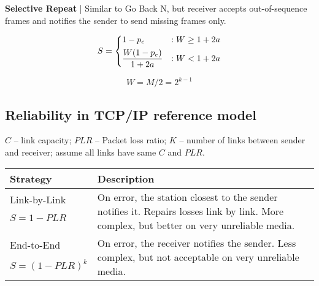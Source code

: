 \documentclass{form}
\begin{document}
\begin{minipage}[c]{0.495\textwidth}
    \textbf{Selective Repeat} |
    Similar to Go Back N, but receiver accepts out-of-sequence frames and notifies the sender to send missing frames only.

    \begin{minipage}{60mm}
        \begin{equation*}
            S = \begin{dcases}
                1-p_e                 & : W \geq 1+2a \\
                \frac{W(1-p_e)}{1+2a} & : W < 1+2a
            \end{dcases}
        \end{equation*}
    \end{minipage}
    \begin{minipage}{30mm}
        \begin{equation*}
            W = M/2 = 2^{k-1}
        \end{equation*}
    \end{minipage}

    \subsection*{Reliability in TCP/IP reference model}
    $C$ -- link capacity; $PLR$ -- Packet loss ratio; $K$ -- number of links between sender and receiver; assume all links have same $C$ and $PLR$.
    \begin{center}
        \begin{tabular}{@{}p{24mm} | p{60mm}}
            \textbf{Strategy} & \textbf{Description} \\ \hline
            Link-by-Link & \multirow{4}{60mm}{On error, the station closest to the sender notifies it. Repairs losses link by link. More complex, but better on very unreliable media.} \\ $S=1-PLR$ \\ \\ \\
            End-to-End   & \multirow{3}{60mm}{On error, the receiver notifies the sender. Less complex, but not acceptable on very unreliable media.} \\ $S=(1-PLR)^k$ \\ \\
        \end{tabular}
    \end{center}
\end{minipage}
\end{document}
